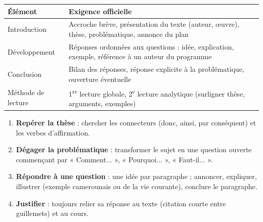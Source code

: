 \documentclass[11pt]{article}
\begin{document}
\begin{aretenir}
\begin{center}
\begin{tabularx}{\linewidth}{|l|X|}\hline
\rowcolor{popblueL} \textbf{Élément} & \textbf{Exigence officielle} \\ \hline
Introduction & Accroche brève, présentation du texte (auteur, \oe uvre), thèse, problématique, annonce du plan \\ \hline
Développement & Réponses ordonnées aux questions : idée, explication, exemple, référence à un auteur du programme \\ \hline
Conclusion & Bilan des réponses, réponse explicite à la problématique, ouverture éventuelle \\ \hline
Méthode de lecture & 1\textsuperscript{re} lecture globale, 2\textsuperscript{e} lecture analytique (surligner thèse, arguments, exemples) \\ \hline
\end{tabularx}
\end{center}
\end{aretenir}

\begin{methode}
\begin{enumerate}
\item \textbf{Repérer la thèse} : chercher les connecteurs (donc, ainsi, par conséquent) et les verbes d'affirmation.
\item \textbf{Dégager la problématique} : transformer le sujet en une question ouverte commençant par « Comment... », « Pourquoi... », « Faut-il... ».
\item \textbf{Répondre à une question} : une idée par paragraphe ; annoncer, expliquer, illustrer (exemple camerounais ou de la vie courante), conclure le paragraphe.
\item \textbf{Justifier} : toujours relier sa réponse au texte (citation courte entre guillemets) et au cours.
\end{enumerate}
\end{methode}
\end{document}
